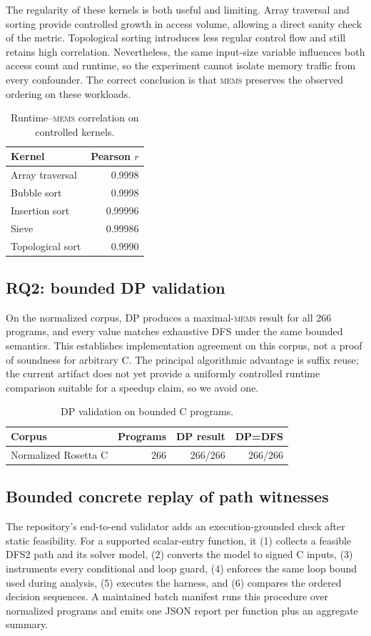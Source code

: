 \documentclass[10pt,conference]{IEEEtran}
\newcommand{\mems}{\textsc{mems}\xspace}
\begin{document}
The regularity of these kernels is both useful and limiting. Array traversal and sorting provide controlled growth in access volume, allowing a direct sanity check of the metric. Topological sorting introduces less regular control flow and still retains high correlation. Nevertheless, the same input-size variable influences both access count and runtime, so the experiment cannot isolate memory traffic from every confounder. The correct conclusion is that \mems preserves the observed ordering on these workloads.

\begin{table}[t]
\centering
\caption{Runtime--\mems correlation on controlled kernels.}
\label{tab:rq1}
\begin{tabular}{lr}
\toprule
Kernel & Pearson $r$\\
\midrule
Array traversal & 0.9998\\
Bubble sort & 0.9998\\
Insertion sort & 0.99996\\
Sieve & 0.99986\\
Topological sort & 0.9990\\
\bottomrule
\end{tabular}
\end{table}

\subsection{RQ2: bounded DP validation}
On the normalized corpus, DP produces a maximal-\mems result for all 266 programs, and every value matches exhaustive DFS under the same bounded semantics. This establishes implementation agreement on this corpus, not a proof of soundness for arbitrary C. The principal algorithmic advantage is suffix reuse; the current artifact does not yet provide a uniformly controlled runtime comparison suitable for a speedup claim, so we avoid one.

\begin{table}[t]
\centering
\caption{DP validation on bounded C programs.}
\label{tab:rq2}
\begin{tabular}{lrrr}
\toprule
Corpus & Programs & DP result & DP=DFS\\
\midrule
Normalized Rosetta C & 266 & 266/266 & 266/266\\
\bottomrule
\end{tabular}
\end{table}

\subsection{Bounded concrete replay of path witnesses}
The repository's end-to-end validator adds an execution-grounded check after static feasibility. For a supported scalar-entry function, it (1) collects a feasible DFS2 path and its solver model, (2) converts the model to signed C inputs, (3) instruments every conditional and loop guard, (4) enforces the same loop bound used during analysis, (5) executes the harness, and (6) compares the ordered decision sequences. A maintained batch manifest runs this procedure over normalized programs and emits one JSON report per function plus an aggregate summary.
\end{document}
